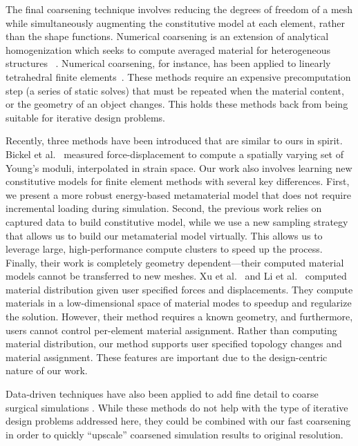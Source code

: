The final coarsening technique involves reducing the degrees of freedom of a mesh while simultaneously augmenting the constitutive model at each element, rather than the shape functions.
Numerical coarsening is an extension of analytical homogenization which seeks to compute averaged material for heterogeneous structures ~\cite{guedes1990,farmer2002}.
Numerical coarsening, for instance, has been applied to linearly tetrahedral finite elements~\cite{Kharevych2009}.
These methods require an expensive precomputation step (a series of static solves) that must be repeated when the material content, or the geometry of an object changes.
This holds these methods back from being suitable for iterative design problems. 

Recently, three methods have been introduced that are similar to ours in spirit.
Bickel et al.~\cite{Bickel2009} measured force-displacement to compute a spatially varying set of Young's moduli, interpolated in strain space.
Our work also involves learning new constitutive models for finite element methods with several key differences.
First, we present a more robust energy-based metamaterial model that does not require incremental loading during simulation.
Second, the previous work relies on captured data to build constitutive model, while we use a new sampling strategy that allows us to build our metamaterial model virtually.
This allows us to leverage large, high-performance compute clusters to speed up the process.
Finally, their work is completely geometry dependent---their computed material models cannot be transferred to new meshes.
Xu et al.~\cite{Xu2014} and Li et al.~\cite{Li2014} computed material distribution given user specified forces and displacements.
	They compute materials in a low-dimensional space of material modes to speedup and regularize the solution.
	However, their method requires a known geometry, and furthermore,
	users cannot control per-element material assignment.
	Rather than computing material distribution,
	our method supports user specified topology changes and material assignment.
	These features are important due to the design-centric nature of our work.

Data-driven techniques have also been applied to add fine detail to coarse surgical simulations \cite{Cotin1999,Kavan:2011,Seiler2012}. While these methods do not help with the type of iterative design problems addressed here, they could be combined with our fast coarsening in order to quickly ``upscale'' coarsened simulation results to original resolution.

